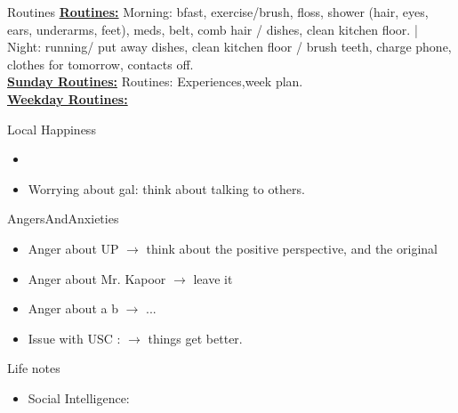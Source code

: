 \begin{columns}
    \begin{column}{0.20\linewidth}
      \begin{block}{Routines}
        { \tiny \underline{\bf Routines:} Morning: bfast, exercise/brush,
          floss, shower (hair, eyes, ears, underarms, feet), meds, belt,
          comb hair / dishes, clean kitchen floor. |  Night: running/ put
          away dishes, clean kitchen floor / brush teeth, charge phone,
          clothes for tomorrow, contacts off.}\\
        {\tiny \underline{\bf Sunday Routines:} Routines:
          Experiences,week plan.}\\ 
        {\tiny \underline{\bf Weekday Routines:}}\\
      \end{block} 
      \begin{block}{Local Happiness}
        \begin{itemize} 
          \tiny \item \tiny
        \item \tiny Worrying about gal: think about talking to others.
        \end{itemize} 
      \end{block}
      \begin{block}{AngersAndAnxieties}
        \begin{itemize}
          \tiny \item \tiny Anger about UP $\rightarrow$ think about the positive
          perspective, and the original
        \item \tiny Anger about Mr. Kapoor $\rightarrow$  leave it
        \item \tiny Anger about a b  $\rightarrow$ ...
        \item \tiny Issue with USC : $\rightarrow$ things get better. 
        \end{itemize}
      \end{block}
      \begin{block}{Life notes}
        \begin{itemize}
          \tiny \item \tiny Social Intelligence: 
        \end{itemize}
      \end{block}


\end{column}
\end{columns}
